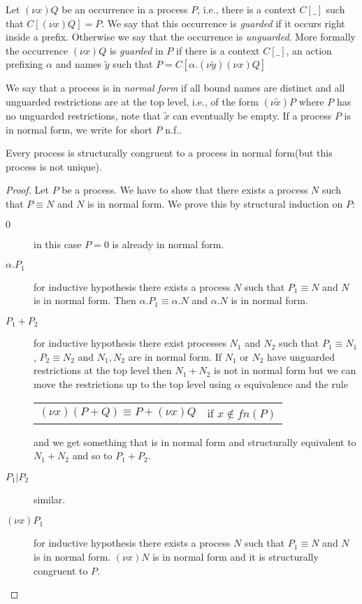 \begin{definition}
  Let $(\nu x)Q$ be an occurrence in a process $P$, i.e., there is a context $C[\_]$ such that $C[(\nu x)Q]=P$. We say that this occurrence is \emph{guarded} if it occurs right inside a prefix. Otherwise we say that the occurrence is \emph{unguarded}. More formally the occurrence $(\nu x)Q$ is \emph{guarded} in $P$ if there is a context $C[\_]$, an action prefixing $\alpha$ and names $\tilde{y}$ such that $P=C[\alpha.(\nu \tilde{y})(\nu x)Q]$
\end{definition}

\begin{definition}
  We say that a process is in \emph{normal form} if all bound names are distinct and all unguarded restrictions are at the top level, i.e., of the form $(\nu \tilde{x})P$ where $P$ has no unguarded restrictions, note that $\tilde{x}$ can eventually be empty. If a process $P$ is in normal form, we write for short $P$ n.f.. 
\end{definition}

\begin{lemma}\label{existenceOfNormalForm}
  Every process is structurally congruent to a process in normal form(but this process is not unique).
  \begin{proof}
    Let $P$ be a process. We have to show that there exists a process $N$ such that $P \equiv N$ and $N$ is in normal form. We prove this by structural induction on $P$:
    \begin{description}
      \item[$0$] 
	in this case $P=0$ is already in normal form.
      \item[$\alpha.P_{1}$] 
	for inductive hypothesis there exists a process $N$ such that $P_{1} \equiv N$ and $N$ is in normal form. Then $\alpha.P_{1} \equiv \alpha.N$ and $\alpha.N$ is in normal form.
      \item[$P_{1}+P_{2}$]
	for inductive hypothesis there exist processes $N_{1}$ and $N_{2}$ such that $P_{1} \equiv N_{1}$, $P_{2} \equiv N_{2}$ and $N_{1}, N_{2}$ are in normal form. If $N_{1}$ or $N_{2}$ have unguarded restrictions at the top level then $N_{1}+N_{2}$ is not in normal form but we can move the restrictions up to the top level using $\alpha$ equivalence and the rule 
	\begin{center}
	  \begin{tabular}{ll}
	      $(\nu x)(P+Q) \equiv P + (\nu x)Q$ 
	    &
	      if $x\notin fn(P)$
	  \end{tabular}
	\end{center}
	and we get something that is in normal form and structurally equivalent to $N_{1}+N_{2}$ and so to $P_{1}+P_{2}$.
      \item[$P_{1}|P_{2}$] similar.
      \item[$(\nu x)P_{1}$] 
	for inductive hypothesis there exists a process $N$ such that $P_{1} \equiv N$ and $N$ is in normal form. $(\nu x)N$ is in normal form and it is structurally congruent to $P$.
    \end{description}
  \end{proof}
\end{lemma}

